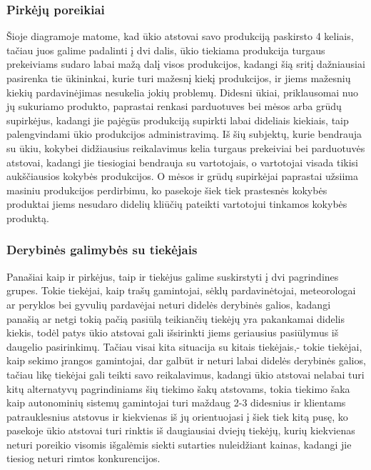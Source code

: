 \documentclass[oneside]{VUMIFPSkursinis}
\begin{document}
\subsubsection{Pirkėjų poreikiai}
Šioje diagramoje matome, kad ūkio atstovai savo produkciją paskirsto 4 keliais, tačiau juos galime padalinti į dvi dalis, ūkio tiekiama produkcija turgaus prekeiviams sudaro labai mažą dalį visos produkcijos, kadangi šią sritį dažniausiai pasirenka tie ūkininkai, kurie turi mažesnį kiekį produkcijos, ir jiems mažesnių kiekių pardavinėjimas nesukelia jokių problemų. Didesni ūkiai, priklausomai nuo jų sukuriamo produkto, paprastai renkasi parduotuves bei mėsos arba grūdų supirkėjus, kadangi jie pajėgūs produkciją supirkti labai dideliais kiekiais, taip palengvindami ūkio produkcijos administravimą. Iš šių subjektų, kurie bendrauja su ūkiu, kokybei didžiausius reikalavimus kelia turgaus prekeiviai bei parduotuvės atstovai, kadangi jie tiesiogiai bendrauja su vartotojais, o vartotojai visada tikisi aukščiausios kokybės produkcijos. O mėsos ir grūdų supirkėjai paprastai užsiima masiniu produkcijos perdirbimu, ko pasekoje šiek tiek prastesnės kokybės produktai jiems nesudaro didelių kliūčių pateikti vartotojui tinkamos kokybės produktą.
\subsubsection{Derybinės galimybės su tiekėjais}
Panašiai kaip ir pirkėjus, taip ir tiekėjus galime suskirstyti į dvi pagrindines grupes. Tokie tiekėjai, kaip trašų gamintojai, sėklų pardavinėtojai, meteorologai ar peryklos bei gyvulių pardavėjai neturi didelės derybinės galios, kadangi panašią ar netgi tokią pačią pasiūlą teikiančių tiekėjų yra pakankamai didelis kiekis, todėl patys ūkio atstovai gali išsirinkti jiems geriausius pasiūlymus iš daugelio pasirinkimų. Tačiau visai kita situacija su kitais tiekėjais,- tokie tiekėjai, kaip sekimo įrangos gamintojai, dar galbūt ir neturi labai didelės derybinės galios, tačiau likę tiekėjai gali teikti savo reikalavimus, kadangi ūkio atstovai nelabai turi kitų alternatyvų pagrindiniams šių tiekimo šakų atstovams, tokia tiekimo šaka kaip autonominių sistemų gamintojai turi maždaug 2-3 didesnius ir klientams patrauklesnius atstovus ir kiekvienas iš jų orientuojasi į šiek tiek kitą pusę, ko pasekoje ūkio atstovai turi rinktis iš daugiausiai dviejų tiekėjų, kurių kiekvienas neturi poreikio visomis išgalėmis siekti sutarties nuleidžiant kainas, kadangi jie tiesiog neturi rimtos konkurencijos.
	
\end{document}
